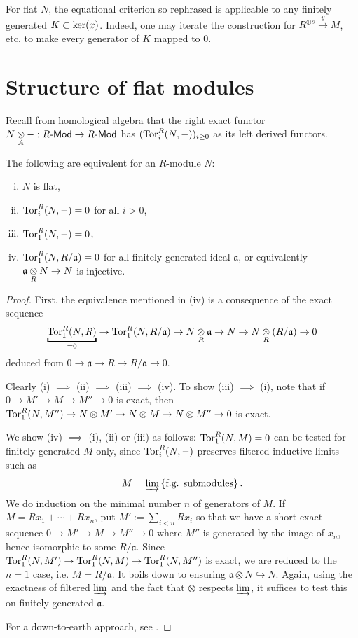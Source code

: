 \begin{remark}\label{rem:equational-flatness-ext}
	For flat $N$, the equational criterion so rephrased is applicable to any finitely generated $K \subset \operatorname{ker}(x)$. Indeed, one may iterate the construction for $R^{\oplus s} \xrightarrow{y} M$, etc. to make every generator of $K$ mapped to $0$.
\end{remark}

\section{Structure of flat modules}
Recall from homological algebra that the right exact functor $N \underset{A}{\otimes} -: R\text{-}\mathsf{Mod} \to R\text{-}\mathsf{Mod}$ has $(\operatorname{Tor}_i^R(N, -))_{i \geq 0}$ as its left derived functors.
\begin{proposition}\label{prop:flat-module}
	The following are equivalent for an $R$-module $N$:
	\begin{enumerate}[(i)]
		\item $N$ is flat,
		\item $\operatorname{Tor}_i^R(N,-)=0$ for all $i > 0$,
		\item $\operatorname{Tor}_1^R(N,-)=0$,
		\item $\operatorname{Tor}_1^R(N, R/\mathfrak{a})=0$ for all finitely generated ideal $\mathfrak{a}$, or equivalently $\mathfrak{a} \underset{R}{\otimes} N \to N$ is injective.
	\end{enumerate}
\end{proposition}
\begin{proof}
	First, the equivalence mentioned in (iv) is a consequence of the exact sequence
	\[ \underbracket{\Tor_1^R(N, R)}_{=0} \to \Tor_1^R(N, R/\mathfrak{a}) \to N \dotimes{R} \mathfrak{a} \to N \to N \dotimes{R} (R/\mathfrak{a}) \to 0 \]
	deduced from $0 \to \mathfrak{a} \to R \to R/\mathfrak{a} \to 0$.

	Clearly (i) $\implies$ (ii) $\implies$ (iii) $\implies$ (iv). To show (iii) $\implies$ (i), note that if $0 \to M' \to M \to M'' \to 0$ is exact, then $\operatorname{Tor}_1^R(N,M'') \to N \otimes M' \to N \otimes M \to N \otimes M'' \to 0$ is exact.
	
	We show (iv) $\implies$ (i), (ii) or (iii) as follows: $\operatorname{Tor}_1^R(N,M)=0$ can be tested for finitely generated $M$ only, since $\operatorname{Tor}^R_i(N,-)$ preserves filtered inductive limits such as
	\[ M = \varinjlim \left\{ \text{f.g. submodules} \right\}. \]
	We do induction on the minimal number $n$ of generators of $M$. If $M = Rx_1 + \cdots + Rx_n$, put $M' := \sum_{i < n} Rx_i$ so that we have a short exact sequence $0 \to M' \to M \to M'' \to 0$ where $M''$ is generated by the image of $x_n$, hence isomorphic to some $R/\mathfrak{a}$. Since $\operatorname{Tor}_1^R(N,M') \to \operatorname{Tor}_1^R(N, M) \to \operatorname{Tor}_1^R(N, M'')$ is exact, we are reduced to the $n=1$ case, i.e. $M = R/\mathfrak{a}$. It boils down to ensuring $\mathfrak{a} \otimes N \hookrightarrow N$. Again, using the exactness of filtered $\varinjlim$ and the fact that $\otimes$ respects $\varinjlim$, it suffices to test this on finitely generated $\mathfrak{a}$.
	
	For a down-to-earth approach, see \cite[\S 6.3]{Eis95}.
\end{proof}

